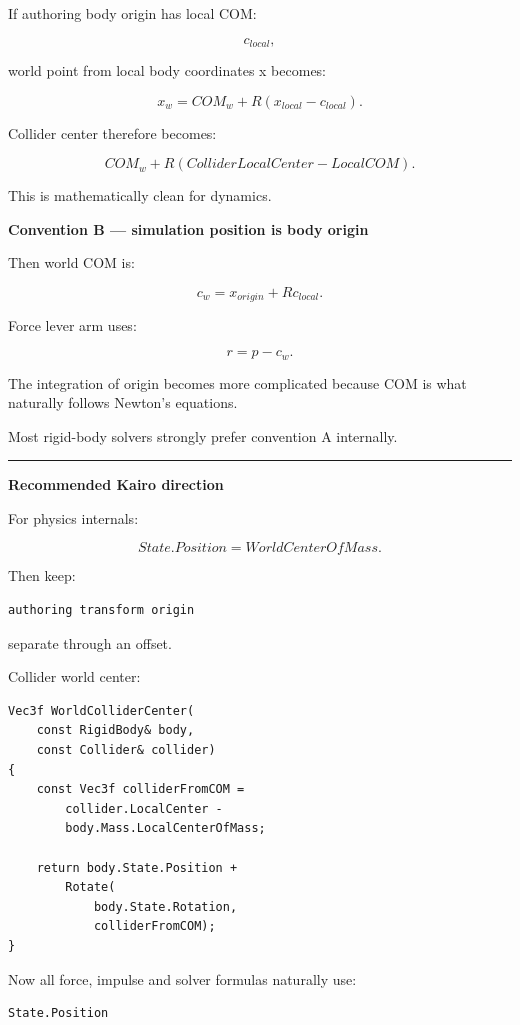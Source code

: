 If authoring body origin has local COM:

\[
c_{local},
\]

world point from local body coordinates x becomes:

\[
x_w
=
COM_w
+
R(x_{local}-c_{local}).
\]

Collider center therefore becomes:

\[
COM_w
+
R(
ColliderLocalCenter-
LocalCOM).
\]

This is mathematically clean for dynamics.

\textbf{Convention B --- simulation position is body origin}

Then world COM is:

\[
\boxed{
c_w
=
x_{origin}
+
Rc_{local}.
}
\]

Force lever arm uses:

\[
r=
p-c_w.
\]

The integration of origin becomes more complicated because COM is what naturally follows Newton's equations.

Most rigid-body solvers strongly prefer convention A internally.

\begin{center}\rule{0.5\linewidth}{0.5pt}\end{center}

\textbf{Recommended Kairo direction}

For physics internals:

\[
\boxed{
State.Position
=
WorldCenterOfMass.
}
\]

Then keep:

\begin{verbatim}
authoring transform origin
\end{verbatim}

separate through an offset.

Collider world center:

\begin{verbatim}
Vec3f WorldColliderCenter(
    const RigidBody& body,
    const Collider& collider)
{
    const Vec3f colliderFromCOM =
        collider.LocalCenter -
        body.Mass.LocalCenterOfMass;

    return body.State.Position +
        Rotate(
            body.State.Rotation,
            colliderFromCOM);
}
\end{verbatim}

Now all force, impulse and solver formulas naturally use:

\begin{verbatim}
State.Position
\end{verbatim}

